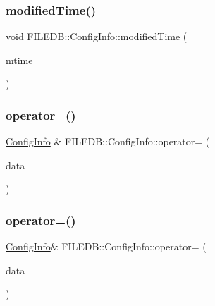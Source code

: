 \mbox{\label{classFILEDB_1_1ConfigInfo_a5c250fc2d94faafa05f18d8126ccf0cb}} 
\subsubsection{\texorpdfstring{modifiedTime()}{modifiedTime()}\hspace{0.1cm}{\footnotesize\ttfamily [4/4]}}
{\footnotesize\ttfamily void F\+I\+L\+E\+D\+B\+::\+Config\+Info\+::modified\+Time (\begin{DoxyParamCaption}\item[{int}]{mtime }\end{DoxyParamCaption})}

\mbox{\label{classFILEDB_1_1ConfigInfo_ac41b56638fe1c002bc2712d16c9cbecb}} 
\subsubsection{\texorpdfstring{operator=()}{operator=()}\hspace{0.1cm}{\footnotesize\ttfamily [1/2]}}
{\footnotesize\ttfamily \mbox{\hyperlink{classFILEDB_1_1ConfigInfo}{Config\+Info}} \& F\+I\+L\+E\+D\+B\+::\+Config\+Info\+::operator= (\begin{DoxyParamCaption}\item[{const \mbox{\hyperlink{classFILEDB_1_1ConfigInfo}{Config\+Info}} \&}]{data }\end{DoxyParamCaption})}

\mbox{\label{classFILEDB_1_1ConfigInfo_addda23bfc94267dee10eb00355316514}} 
\subsubsection{\texorpdfstring{operator=()}{operator=()}\hspace{0.1cm}{\footnotesize\ttfamily [2/2]}}
{\footnotesize\ttfamily \mbox{\hyperlink{classFILEDB_1_1ConfigInfo}{Config\+Info}}\& F\+I\+L\+E\+D\+B\+::\+Config\+Info\+::operator= (\begin{DoxyParamCaption}\item[{const \mbox{\hyperlink{classFILEDB_1_1ConfigInfo}{Config\+Info}} \&}]{data }\end{DoxyParamCaption})}

